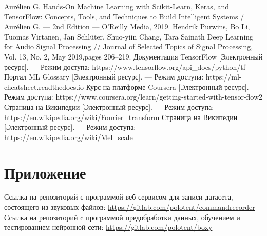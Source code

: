\documentclass[14pt]{article}
\begin{document}
\begin{thebibliography}{3}
Aurélien G. Hands-On Machine Learning with Scikit-Learn, Keras, and TensorFlow: Concepts, Tools, and Techniques to Build Intelligent Systems / Aurélien G. --- 2nd Edition --- O'Reilly Media, 2019.
Hendrik Purwins, Bo Li, Tuomas Virtanen, Jan Schlüter, Shuo-yiin Chang, Tara Sainath Deep Learning for Audio Signal Processing // Journal  of  Selected  Topics  of  Signal  Processing,  Vol.  13,  No.  2,  May  2019,pages 206–219.
Документация TensorFlow [Электронный ресурс]. --- Режим доступа: https://www.tensorflow.org/api\_docs/python/tf
Портал ML Glossary [Электронный ресурс]. --- Режим доступа: https://ml-cheatsheet.readthedocs.io
Курс на платформе Coursera [Электронный ресурс]. --- Режим доступа: https://www.coursera.org/learn/getting-started-with-tensor-flow2
Страница на Википедии [Электронный ресурс]. --- Режим доступа: https://en.wikipedia.org/wiki/Fourier\_transform
Страница на Википедии [Электронный ресурс]. --- Режим доступа: https://en.wikipedia.org/wiki/Mel\_scale

\end{thebibliography}
\newpage

\section*{Приложение}
Ссылка на репозиторий с программой веб-сервисом для записи датасета, состоящего из звуковых файлов: \url{https://gitlab.com/polotent/commandrecorder} \\

Ссылка на репозиторий c программой предобработки данных, обучением и тестированием нейронной сети: \url{https://gitlab.com/polotent/boxy}
\restoregeometry
\end{document}
